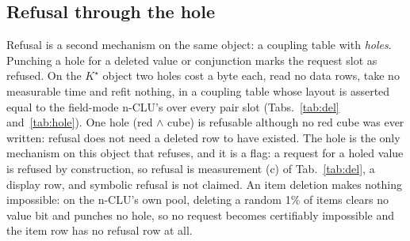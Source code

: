 \documentclass{article} %
\newcommand{\Kstar}{\ensuremath{K^{\star}}}
\begin{document}
\subsection{Refusal through the hole}
\label{sec:hole}

Refusal is a second mechanism on the same object: a coupling table with \emph{holes}.
Punching a hole for a deleted value or conjunction marks the request slot as refused. On the
$\Kstar$ object two holes cost a byte each, read no data rows, take no measurable time and refit nothing, in
a coupling table whose layout is asserted equal to the field-mode n-CLU's over every pair
slot (Tabs.~\ref{tab:del} and~\ref{tab:hole}). %
One hole (red $\wedge$ cube) is refusable although no red cube was ever written: refusal does
not need a deleted row to have existed. %
The hole is the only mechanism on this object that refuses, and it is a flag: a request for a
holed value is refused by construction, so refusal is measurement (c) of Tab.~\ref{tab:del}, a
display row, and symbolic refusal is not claimed. An item deletion makes nothing impossible: on the n-CLU's own pool, deleting a random
1\% of items clears no value bit and punches no hole, so no request becomes certifiably impossible
and the item row has no refusal row at all. %
\end{document}
